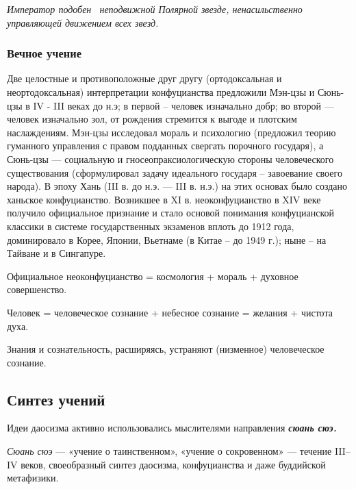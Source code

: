 \documentclass[twoside,a4paper]{article}
\begin{document}
{\itshape
Император подобен \ неподвижной Полярной звезде, ненасильственно управляющей движением всех звезд.}

\subsubsection{}
\subsubsection{{\textquotedbl}Вечное{\textquotedbl} учение}
{
Две целостные и противоположные друг другу (ортодоксальная и неортодоксальная) интерпретации конфуцианства предложили
Мэн-цзы и Сюнь-цзы в IV - III веках до н.э; в первой – человек изначально добр; во второй — человек изначально зол, от
рождения стремится к выгоде и плотским наслаждениям. Мэн-цзы исследовал мораль и психологию (предложил теорию
{\textquotedbl}гуманного управления{\textquotedbl} с правом подданных свергать порочного государя), а Сюнь-цзы —
социальную и гносеопраксиологическую стороны человеческого существования (сформулировал задачу идеального государя –
{\textquotedbl}завоевание{\textquotedbl} своего народа). В эпоху Хань (III в. до н.э. — III в. н.э.) на этих основах
было создано {\textquotedbl}ханьское конфуцианство{\textquotedbl}. Возникшее в XI в. неоконфуцианство в XIV веке
получило официальное признание и стало основой понимания конфуцианской классики в системе государственных экзаменов
вплоть до 1912 года, доминировало в Корее, Японии, Вьетнаме (в Китае – до 1949 г.); ныне – на Тайване и в Сингапуре. }

{
Официальное неоконфуцианство = космология + мораль + духовное совершенство. }

{
Человек = человеческое сознание + небесное сознание = желания + чистота духа. }

{
Знания и сознательность, расширяясь, устраняют (низменное) человеческое сознание. }

\subsection[Синтез учений]{ Синтез учений}
{
Идеи даосизма активно использовались мыслителями направления \textbf{\textit{сюань сюэ.}}}

{
\textit{Сюань сюэ} — «учение о таинственном», «учение о сокровенном» — течение
\foreignlanguage{english}{III}–\foreignlanguage{english}{IV} веков, своеобразный синтез даосизма, конфуцианства и даже
буддийской метафизики. }
\end{document}
